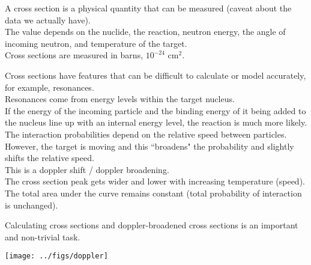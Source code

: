 \documentclass[12pt]{article}
\begin{document}
A cross section is a physical quantity that can be measured (caveat about the data we actually have).\\
The value depends on the nuclide, the reaction, neutron energy, the angle of incoming neutron, and temperature of the target. \\
Cross sections are measured in barns, $10^{-24}$ cm$^2$.

Cross sections have features that can be difficult to calculate or model accurately, for example, resonances.\\
Resonances come from energy levels within the target nucleus. \\
If the energy of the incoming particle and the binding energy of it being added to the nucleus line up with an internal energy level, the reaction is much more likely.\\

The interaction probabilities depend on the relative speed between particles.\\
However, the target is moving and this ``broadens" the probability and slightly shifts the relative speed.\\
This is a doppler shift / doppler broadening.\\
The cross section peak gets wider and lower with increasing temperature (speed).\\
The total area under the curve remains constant (total probability of interaction is unchanged).

Calculating cross sections and doppler-broadened cross sections is an important and non-trivial task.

\begin{center}
\texttt{[image: ../figs/doppler]}
\end{center}
\end{document}
